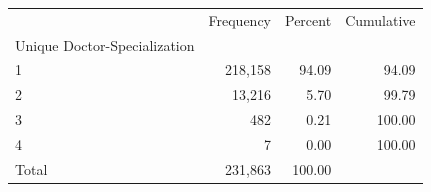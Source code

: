 \documentclass{article}
\begin{document}
\begin{table}[!h]
\centering
\begin{tabular}{llll}
\cline{1-4}
\multicolumn{1}{c}{} &
  \multicolumn{1}{r}{Frequency} &
  \multicolumn{1}{r}{Percent} &
  \multicolumn{1}{r}{Cumulative} \\
\cline{1-4}
\multicolumn{1}{l}{Unique Doctor-Specialization} &
  \multicolumn{1}{r}{} &
  \multicolumn{1}{r}{} &
  \multicolumn{1}{r}{} \\
\multicolumn{1}{l}{\hspace{1em}1} &
  \multicolumn{1}{r}{218,158} &
  \multicolumn{1}{r}{94.09} &
  \multicolumn{1}{r}{94.09} \\
\multicolumn{1}{l}{\hspace{1em}2} &
  \multicolumn{1}{r}{13,216} &
  \multicolumn{1}{r}{5.70} &
  \multicolumn{1}{r}{99.79} \\
\multicolumn{1}{l}{\hspace{1em}3} &
  \multicolumn{1}{r}{482} &
  \multicolumn{1}{r}{0.21} &
  \multicolumn{1}{r}{100.00} \\
\multicolumn{1}{l}{\hspace{1em}4} &
  \multicolumn{1}{r}{7} &
  \multicolumn{1}{r}{0.00} &
  \multicolumn{1}{r}{100.00} \\
\multicolumn{1}{l}{\hspace{1em}Total} &
  \multicolumn{1}{r}{231,863} &
  \multicolumn{1}{r}{100.00} &
  \multicolumn{1}{r}{} \\
\cline{1-4}
\end{tabular}
\end{table}
\end{document}
